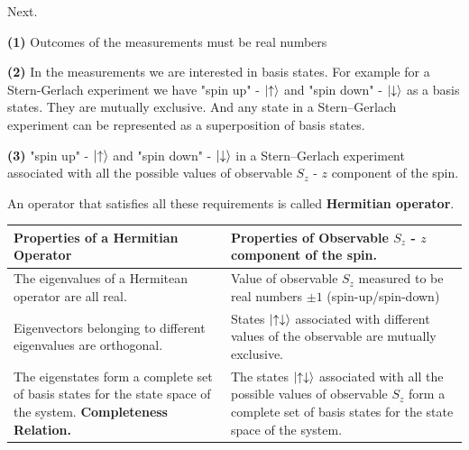 \documentclass{article}
\begin{document}


Next.

\textbf{(1)} Outcomes of the measurements must be real numbers

\textbf{(2)} In the measurements we are interested in basis states. For example for a Stern-Gerlach experiment we have "spin up" - $\ket{\uparrow}$  and "spin down" - $\ket{\downarrow}$ as a basis states. They are mutually exclusive. And any state in a Stern–Gerlach experiment can be represented as a superposition of basis states.

\textbf{(3)} "spin up" - $\ket{\uparrow}$  and "spin down" - $\ket{\downarrow}$ in a Stern–Gerlach experiment associated with all the possible values of observable $S_{z}$ - $z$ component of the spin.


An operator that satisfies all these requirements is called \textbf{Hermitian operator}.





\begin{tabular}{|p{70mm}|p{70mm}|}
\hline
\textbf{Properties of a Hermitian Operator}  & \textbf{Properties of Observable $S_{z}$ - $z$ component of the spin.} \\
\hline
The eigenvalues of a Hermitean operator are all real. & 
Value of observable $S_{z}$ measured to be real numbers $\pm 1 $ (spin-up/spin-down) \\
\hline
Eigenvectors belonging to different eigenvalues are orthogonal. & 
States $\ket{\uparrow\downarrow}$ associated with different values of the observable are mutually exclusive. \\
\hline
The eigenstates form a complete set of basis
states for the state space of the system. \textbf{Completeness Relation.} & 
The states $\ket{\uparrow\downarrow}$ associated with all the possible
values of observable $S_{z}$ form a complete set of
basis states for the state space of the system.\\
\hline
\end{tabular}
\end{document}
